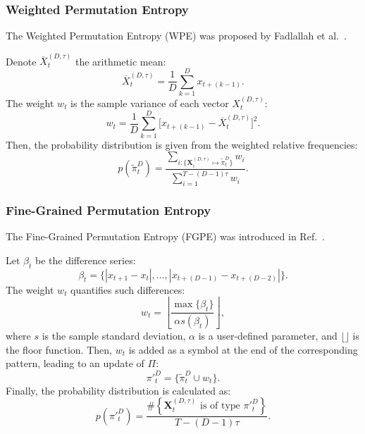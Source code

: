 \documentclass[journal]{IEEEtran}
\begin{document}
\subsubsection{Weighted Permutation Entropy}\label{WPE}

The Weighted Permutation Entropy (WPE) was proposed by Fadlallah et al.~\cite{Fadlallah2013Weightedpermutation}. 

Denote $\overline{X}_t^{(D, \tau)}$ the arithmetic mean:
\begin{equation}
\overline{X}_t^{(D, \tau)} = \frac{1}{D} \sum_{k = 1}^{D} x_{t + (k - 1)}.
\end{equation}
The weight $w_{t}$ is the sample variance of each vector $X_t^{(D, \tau)}$:
\begin{equation}
w_{t} = \frac{1}{D} \sum_{k = 1}^{D}\big[x_{t + (k - 1)} - \overline{X}_t^{(D, \tau)}\big]^2 .
\end{equation}
Then, the probability distribution is given from the weighted relative frequencies:
\begin{equation}
p(\widetilde \pi_t^D) = \frac{\sum_{i : \{\mathbf{X}^{(D,\tau)}_i \mapsto \widetilde\pi^D_t\}} w_{i}}{\sum_{i = 1}^{T-(D-1)\tau} w_{i}}.
\end{equation}

\subsubsection{Fine-Grained Permutation Entropy}\label{FGPE}

The Fine-Grained Permutation Entropy (FGPE) was introduced in Ref.~\cite{xiao2009fine}.

Let $\beta_t$ be the difference series:
\begin{equation}
\beta_t = \big\{|x_{t+1} - x_t|, \dots, |x_{t+(D-1)} - x_{t+(D-2)}|\big\}.
\end{equation}
The weight $w_t$ quantifies such differences:
\begin{equation}
w_t = \left \lfloor \frac{\max\{\beta_t\}}{\alpha s(\beta_t) } \right \rfloor,
\end{equation}
where $s$ is the sample standard deviation,
$\alpha$ is a user-defined parameter, 
and $\lfloor \rfloor$ is the floor function.
Then, $w_t$ is added as a symbol at the end of the corresponding pattern, leading to an update of $\Pi$:
\begin{equation}
\pi{'}_t^D = \{ \widetilde \pi_t^D \cup w_t\}.
\end{equation} 
Finally, the probability distribution is calculated as:
\begin{equation}
p(\pi{'}_t^D) = \frac{\#\left \{\mathbf{X}_t^{(D,\tau)} \text{ is of type } \pi{'}_t^D\right \}}{T- (D-1)\tau}.
\end{equation}
\end{document}
